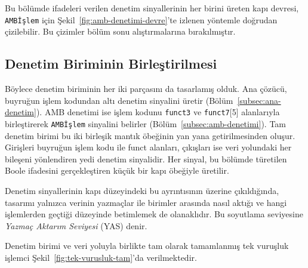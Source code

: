 Bu bölümde ifadeleri verilen denetim sinyallerinin her birini üreten kapı devresi, \texttt{AMBİşlem} için Şekil~\ref{fig:amb-denetimi-devre}'te izlenen yöntemle doğrudan çizilebilir. Bu çizimler bölüm sonu alıştırmalarına bırakılmıştır.

\subsection{Denetim Biriminin Birleştirilmesi}
\label{subsec:denetim-birlestirme}

Böylece denetim biriminin her iki parçasını da tasarlamış olduk. Ana çözücü, buyruğun işlem kodundan altı denetim sinyalini üretir (Bölüm~\ref{subsec:ana-denetim}). AMB denetimi ise işlem kodunu \texttt{funct3} ve \texttt{funct7}[5] alanlarıyla birleştirerek \texttt{AMBİşlem} sinyalini belirler (Bölüm~\ref{subsec:amb-denetimi}). Tam denetim birimi bu iki birleşik mantık öbeğinin yan yana getirilmesinden oluşur. Girişleri buyruğun işlem kodu ile funct alanları, çıkışları ise veri yolundaki her bileşeni yönlendiren yedi denetim sinyalidir. Her sinyal, bu bölümde türetilen Boole ifadesini gerçekleştiren küçük bir kapı öbeğiyle üretilir.

Denetim sinyallerinin kapı düzeyindeki bu ayrıntısının üzerine çıkıldığında, tasarımı yalnızca verinin yazmaçlar ile birimler arasında nasıl aktığı ve hangi işlemlerden geçtiği düzeyinde betimlemek de olanaklıdır. Bu soyutlama seviyesine \emph{Yazmaç Aktarım Seviyesi} (YAS) denir.

Denetim birimi ve veri yoluyla birlikte tam olarak tamamlanmış tek vuruşluk işlemci Şekil~\ref{fig:tek-vurusluk-tam}'da verilmektedir.

